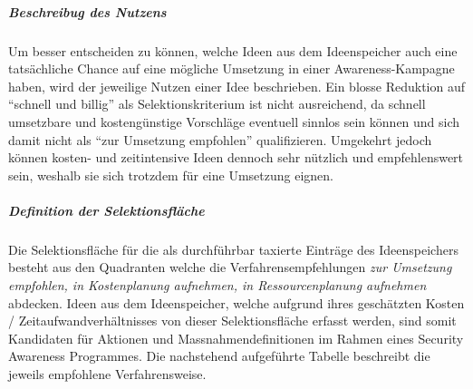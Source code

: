 \documentclass[../../main.tex]{subfiles}
\begin{document}
\subparagraph*{Beschreibug des Nutzens}\mbox{}

\begin{sloppypar}
Um besser entscheiden zu können, welche Ideen aus dem Ideenspeicher auch eine tatsächliche Chance auf eine mögliche Umsetzung in einer Awareness-Kampagne haben, wird der jeweilige Nutzen einer Idee beschrieben. Ein blosse Reduktion auf "`schnell und billig"' als Selektionskriterium ist nicht ausreichend, da schnell umsetzbare und kostengünstige Vorschläge eventuell sinnlos sein können und sich damit nicht als "`zur Umsetzung empfohlen"' qualifizieren. Umgekehrt jedoch können kosten- und zeitintensive Ideen dennoch sehr nützlich und empfehlenswert sein, weshalb sie sich trotzdem für eine Umsetzung eignen.
\end{sloppypar}

\subparagraph*{Definition der Selektionsfläche}\mbox{}

\begin{sloppypar}
Die Selektionsfläche für die als durchführbar taxierte Einträge des Ideenspeichers besteht aus den Quadranten welche die Verfahrensempfehlungen \textit{zur Umsetzung empfohlen, in Kostenplanung aufnehmen, in Ressourcenplanung aufnehmen} abdecken. Ideen aus dem Ideenspeicher, welche aufgrund ihres geschätzten Kosten / Zeitaufwandverhältnisses von dieser Selektionsfläche erfasst werden, sind somit Kandidaten für Aktionen und Massnahmendefinitionen im Rahmen eines Security Awareness Programmes. Die nachstehend aufgeführte Tabelle beschreibt die jeweils empfohlene Verfahrensweise.
\end{sloppypar}

\end{document}
